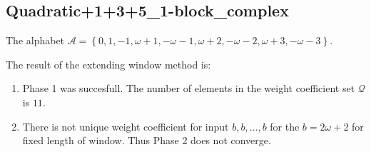 \subsection{ Quadratic+1+3+5\_1-block\_complex }

\label{subsec:Quadratic+1+3+51-blockcomplex}

The alphabet $\mathcal{A} =\left\{0, 1, -1, \omega + 1, -\omega - 1, \omega + 2, -\omega - 2, \omega + 3, -\omega - 3\right\}$.

\noindent The result of the extending window method is:
\begin{enumerate}
    \item Phase 1 was succesfull.
The number of elements in the weight coefficient set $\mathcal{Q}$ is $11$.

    \item There is not unique weight coefficient for input $b,b,\dots,b$ for the $b= 2\omega + 2 $ for fixed length of window. Thus Phase 2 does not converge.

\end{enumerate}
